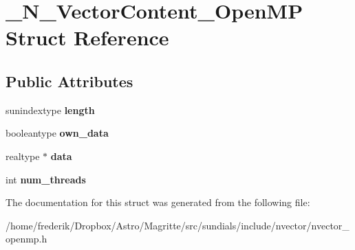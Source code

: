 \hypertarget{struct__N__VectorContent__OpenMP}{}\section{\+\_\+\+N\+\_\+\+Vector\+Content\+\_\+\+Open\+MP Struct Reference}
\label{struct__N__VectorContent__OpenMP}
\subsection*{Public Attributes}
\begin{DoxyCompactItemize}
\item 
\mbox{\label{struct__N__VectorContent__OpenMP_ade6bf3ff45a9901fba7c84454f519099}} 
sunindextype {\bfseries length}
\item 
\mbox{\label{struct__N__VectorContent__OpenMP_a4e2db2cf57cfd6db44c42c5b34d1e45e}} 
booleantype {\bfseries own\+\_\+data}
\item 
\mbox{\label{struct__N__VectorContent__OpenMP_a592602053b0a77ad51c1faf09c124b92}} 
realtype $\ast$ {\bfseries data}
\item 
\mbox{\label{struct__N__VectorContent__OpenMP_a8cb2e35e2b067a20731a386abc55a154}} 
int {\bfseries num\+\_\+threads}
\end{DoxyCompactItemize}


The documentation for this struct was generated from the following file\+:\begin{DoxyCompactItemize}
\item 
/home/frederik/\+Dropbox/\+Astro/\+Magritte/src/sundials/include/nvector/nvector\+\_\+openmp.\+h\end{DoxyCompactItemize}

